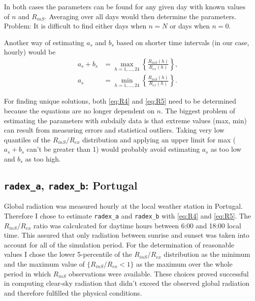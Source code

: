 \documentclass{scrreprt}
\begin{document}
In both cases the parameters can be found for any given day with known values of $n$ and $R_{inS}$.
Averaging over all days would then determine the parameters.
Problem: It is difficult to find either days when $n=N$ or days when $n=0$.

Another way of estimating $a_s$ and $b_s$ based on shorter time intervals (in our case, hourly) would be
\begin{align}
  a_s + b_s &= \max_{h = 1, ..., 24} \left \{ \frac{R_{inS} (h)}{R_{ex} (h)} \right \}, \label{eq:R4} \\
  a_s &= \min_{h = 1, ..., 24} \left \{ \frac{R_{inS} (h)}{R_{ex} (h)} \right \}. \label{eq:R5}
\end{align}

For finding unique solutions, both \eqref{eq:R4} and \eqref{eq:R5} need to be determined because the equations are no longer dependent on $n$.
The biggest problem of estimating the parameters with subdaily data is that extreme values (max, min) can result from measuring errors and statistical outliers.
Taking very low quantiles of the $R_{inS}/R_{ex}$ distribution and applying an upper limit for max ($a_s + b_s$ can't be greater than 1) would probably avoid estimating $a_s$ as too low and $b_s$ as too high.

\subsection{\texttt{radex\_a}, \texttt{radex\_b}: Portugal} \label{ssec:parest_rad_radexportugal}

Global radiation was measured hourly at the local weather station in Portugal.
Therefore I chose to estimate \verb!radex_a! and \verb!radex_b! with \eqref{eq:R4} and \eqref{eq:R5}.
The $R_{inS}/R_{ex}$ ratio was calculcated for daytime hours between 6:00 and 18:00 local time.
This assured that only radiation between sunrise and sunset was taken into account for all of the simulation period.
For the determination of reasonable values I chose the lower 5-percentile of the $R_{inS}/R_{ex}$ distribution as the minimum and the maximum value of $\{R_{inS}/R_{ex} < 1\}$ as the maximum over the whole period in which $R_{inS}$ observations were available.
These choices proved successful in computing clear-sky radiation that didn't exceed the observed global radiation and therefore fulfilled the physical conditions.
\end{document}
